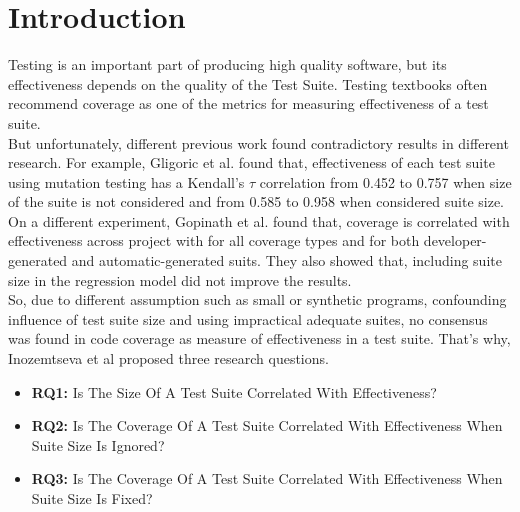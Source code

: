 \section{Introduction}
Testing is an important part of producing high quality software, but its effectiveness depends on the quality of the Test Suite. Testing textbooks often recommend coverage as one of the metrics for measuring effectiveness of a test suite. \\%
But unfortunately, different previous work found contradictory results in different research. For example, Gligoric et al. \cite{gligoric2015guidelines} found that, effectiveness of each test suite using mutation testing has a Kendall's $\tau$ correlation from 0.452 to 0.757 when size of the suite is not considered and from 0.585 to 0.958 when considered suite size. On a different experiment, Gopinath et al. \cite{gopinath2014code} found that, coverage is correlated with effectiveness across project with for all coverage types and for both developer-generated and automatic-generated suits. They also showed that, including suite size in the regression model did not improve the results. \\
So, due to different assumption such as small or synthetic programs, confounding influence of test suite size and using impractical adequate suites, no consensus was found in code coverage as measure of effectiveness in a test suite. That's why, Inozemtseva et al \cite{inozemtseva2014coverage} proposed three research questions.
\begin{itemize}
    \item \textbf{RQ1:} Is The Size Of A Test Suite Correlated With Effectiveness?
    \item \textbf{RQ2:} Is The Coverage Of A Test Suite Correlated With Effectiveness When Suite Size Is Ignored?
    \item \textbf{RQ3:} Is The Coverage Of A Test Suite Correlated With Effectiveness When Suite Size Is Fixed?
\end{itemize}



